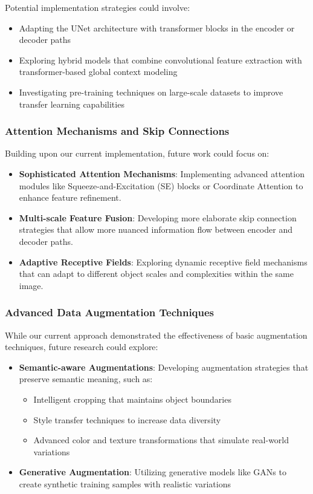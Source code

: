 \documentclass[twocolumn,a4paper]{article}
\begin{document}
Potential implementation strategies could involve:
\begin{itemize}
    \item Adapting the UNet architecture with transformer blocks in the encoder or decoder paths
    \item Exploring hybrid models that combine convolutional feature extraction with transformer-based global context modeling
    \item Investigating pre-training techniques on large-scale datasets to improve transfer learning capabilities
\end{itemize}

\subsubsection{Attention Mechanisms and Skip Connections}
Building upon our current implementation, future work could focus on:
\begin{itemize}
    \item \textbf{Sophisticated Attention Mechanisms}: Implementing advanced attention modules like Squeeze-and-Excitation (SE) blocks or Coordinate Attention to enhance feature refinement.
    \item \textbf{Multi-scale Feature Fusion}: Developing more elaborate skip connection strategies that allow more nuanced information flow between encoder and decoder paths.
    \item \textbf{Adaptive Receptive Fields}: Exploring dynamic receptive field mechanisms that can adapt to different object scales and complexities within the same image.
\end{itemize}

\subsubsection{Advanced Data Augmentation Techniques}
While our current approach demonstrated the effectiveness of basic augmentation techniques, future research could explore:
\begin{itemize}
    \item \textbf{Semantic-aware Augmentations}: Developing augmentation strategies that preserve semantic meaning, such as:
    \begin{itemize}
        \item Intelligent cropping that maintains object boundaries
        \item Style transfer techniques to increase data diversity
        \item Advanced color and texture transformations that simulate real-world variations
    \end{itemize}
    \item \textbf{Generative Augmentation}: Utilizing generative models like GANs to create synthetic training samples with realistic variations
\end{itemize}
\end{document}
